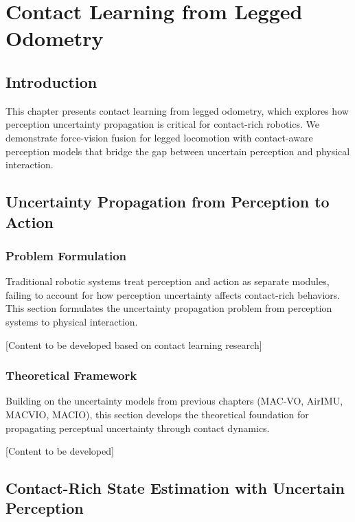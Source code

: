 \chapter{Contact Learning from Legged Odometry} \label{chapter:contact_learning}

\section{Introduction}

This chapter presents contact learning from legged odometry, which explores how perception uncertainty propagation is critical for contact-rich robotics. We demonstrate force-vision fusion for legged locomotion with contact-aware perception models that bridge the gap between uncertain perception and physical interaction.

\section{Uncertainty Propagation from Perception to Action}

\subsection{Problem Formulation}

Traditional robotic systems treat perception and action as separate modules, failing to account for how perception uncertainty affects contact-rich behaviors. This section formulates the uncertainty propagation problem from perception systems to physical interaction.

[Content to be developed based on contact learning research]

\subsection{Theoretical Framework}

Building on the uncertainty models from previous chapters (MAC-VO, AirIMU, MACVIO, MACIO), this section develops the theoretical foundation for propagating perceptual uncertainty through contact dynamics.

[Content to be developed]

\section{Contact-Rich State Estimation with Uncertain Perception}

